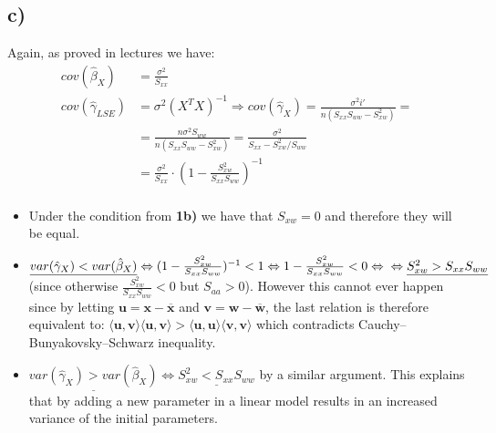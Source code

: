 \documentclass[a4paper]{article}
\begin{document}
\subsection{c)}
Again, as proved in lectures we have:
\begin{equation*}
\begin{split}
	cov(\hat{\beta}_{X}) & = \frac{\sigma^2}{S_{xx}}\\
	cov(\hat{\gamma}_{LSE}) & = \sigma^2(X^TX)^{-1} \Rightarrow cov(\hat{\gamma}_{X}) = \frac{\sigma^2i'}{n(S_{xx}S_{ww}-S_{xw}^2)} = \\
	& = \frac{n\sigma^2S_{ww}}{n(S_{xx}S_{ww}-S_{xw}^2)} = \frac{\sigma^2}{S_{xx}-{S_{xw}^2}/{S_{ww}}} \\
	& = \frac{\sigma^2}{S_{xx}} \cdot (1-\frac{S_{xw}^2}{S_{xx}S_{ww}})^{-1} \\
\end{split}
\end{equation*}
\begin{itemize}
	\item Under the condition from \textbf{1b)} we have that $S_{xw}=0$ and therefore they will be equal.
	\item $\underline{var(\hat{\gamma}_{X})<var(\hat{\beta}_{X})} \Leftrightarrow (1-\frac{S_{xw}^2}{S_{xx}S_{ww}})^{-1}<1 \Leftrightarrow 1-\frac{S_{xw}^2}{S_{xx}S_{ww}} < 0 \Leftrightarrow \\ \Leftrightarrow \underline{S_{xw}^2>S_{xx}S_{ww}}$ (since otherwise $\frac{S_{xw}^2}{S_{xx}S_{ww}}<0$ but $S_{aa}>0$). However this cannot ever happen since by letting $\textbf{u}=\textbf{x}-\overline{\textbf{x}}$ and $\textbf{v}=\textbf{w}-\overline{\textbf{w}}$, the last relation is therefore equivalent to: $\langle\textbf{u}, \textbf{v}\rangle\langle\textbf{u}, \textbf{v}\rangle > \langle\textbf{u}, \textbf{u}\rangle\langle\textbf{v}, \textbf{v}\rangle$ which contradicts Cauchy–Bunyakovsky–Schwarz inequality.
	\item $\underline{var(\hat{\gamma}_{X})>var(\hat{\beta}_{X})} \Leftrightarrow \underline{S_{xw}^2<S_{xx}S_{ww}}$ by a similar argument. This explains that by adding a new parameter in a linear model results in an increased variance of the initial parameters.
\end{itemize}
\end{document}
